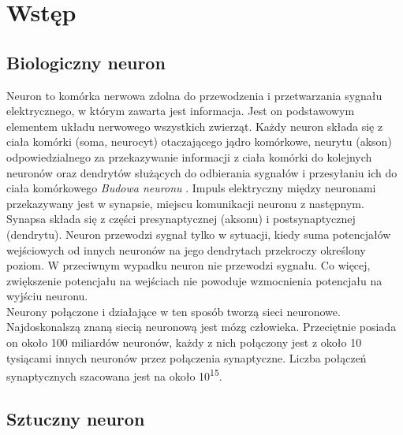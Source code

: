 
\chapter{Wstęp}

\section{Biologiczny neuron}

Neuron to komórka nerwowa zdolna do przewodzenia i przetwarzania sygnału
elektrycznego, w którym zawarta jest informacja. Jest on podstawowym elementem
układu nerwowego wszystkich zwierząt. Każdy neuron składa się z
ciała komórki (soma, neurocyt) otaczającego jądro komórkowe, neurytu (akson)
odpowiedzialnego za przekazywanie informacji z ciała komórki do kolejnych neuronów
oraz dendrytów służących do odbierania sygnałów i przesyłaniu ich do ciała
komórkowego \textit{Budowa neuronu} \cite{CS231n, NNbiology}.
Impuls elektryczny między neuronami przekazywany jest
w synapsie, miejscu komunikacji neuronu z następnym. Synapsa składa się
z części presynaptycznej (aksonu) i postsynaptycznej (dendrytu). Neuron
przewodzi sygnał tylko w sytuacji, kiedy suma potencjałów wejściowych od innych
neuronów na jego dendrytach przekroczy określony poziom. W przeciwnym wypadku
neuron nie przewodzi sygnału. Co więcej, zwiększenie potencjału na wejściach
nie powoduje wzmocnienia potencjału na wyjściu neuronu.\\
Neurony połączone i działające w ten sposób tworzą sieci neuronowe. Najdoskonalszą
znaną siecią neuronową jest mózg człowieka. Przeciętnie posiada on około 100
miliardów neuronów, każdy z nich połączony jest z około 10 tysiącami innych
neuronów przez połączenia synaptyczne. Liczba połączeń synaptycznych szacowana
jest na około 10\textsuperscript{15}.

\section{Sztuczny neuron}

